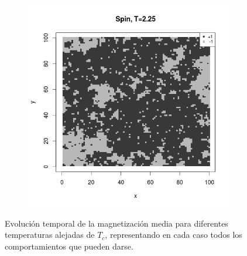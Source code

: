 \documentclass{scrartcl}
\begin{document}
\begin{figure}[ht]
\begin{subfigure}{.35\textwidth}
\end{subfigure}%
\begin{subfigure}{.35\textwidth}
  \centering
  \includegraphics[width=1\linewidth]{spins/spinT2_25}
\end{subfigure}
\caption{Evolución temporal de la magnetización media para diferentes temperaturas alejadas de $T_c$, representando en cada caso todos los comportamientos que pueden darse.}
\label{fig:spinsTc}
\end{figure}
\end{document}
